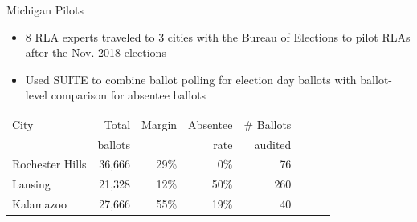 \documentclass[final]{beamer}
\newlength{\onecolwid}
\newlength{\twocolwid}
\begin{document}
\begin{frame}[t]
\begin{columns}[t]
\begin{column}{\twocolwid}
\begin{columns}[t,totalwidth=\twocolwid]
\begin{column}{\onecolwid}
\begin{block}{Michigan Pilots}
\begin{itemize}
\item 8 RLA experts traveled to 3 cities with the Bureau of Elections to pilot RLAs after the Nov. 2018 elections \\
\item Used SUITE to combine ballot polling for election day ballots with ballot-level comparison
for absentee ballots
\end{itemize}

\begin{table}[h]
\begin{center}
\begin{tabular}{l|rrrrrrr}
City & Total  & Margin &   Absentee    & \# Ballots  \\
       & ballots &             &   rate                    & audited  \\
\hline
Rochester Hills & 36,666 & 29\% & 0\% & 76 \\
Lansing & 21,328 & 12\% & 50\% & 260 \\
Kalamazoo & 27,666 & 55\% & 19\% & 40 
\end{tabular}
\end{center}
\label{tab:audit_summary}
\end{table}%

\end{block}


\end{column} %

\end{columns} %




\end{column}
\end{columns}
\end{frame}
\end{document}
